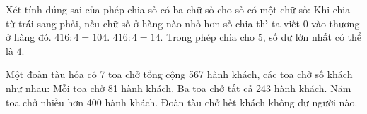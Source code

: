 \begin{ex} %
Xét tính đúng sai của phép chia số có ba chữ số cho số có một chữ số:
\choiceTF
{\True Khi chia từ trái sang phải, nếu chữ số ở hàng nào nhỏ hơn số chia thì ta viết 0 vào thương ở hàng đó.}
{\True $416 : 4 = 104$.}
{$416 : 4 = 14$.}
{\True Trong phép chia cho 5, số dư lớn nhất có thể là 4.}
\end{ex}

\begin{ex} %
Một đoàn tàu hỏa có 7 toa chở tổng cộng 567 hành khách, các toa chở số khách như nhau:
\choiceTF
{\True Mỗi toa chở 81 hành khách.}
{\True Ba toa chở tất cả 243 hành khách.}
{Năm toa chở nhiều hơn 400 hành khách.}
{\True Đoàn tàu chở hết khách không dư người nào.}
\end{ex}


